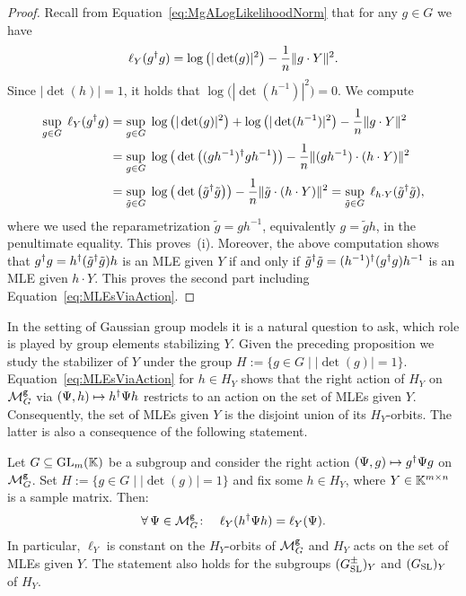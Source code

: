 \begin{proof}
	Recall from Equation~\eqref{eq:MgALogLikelihoodNorm} that for any $g \in G$ we have
	\begin{align*}
		\ell_Y(g^{\dagger} g) = \log \big( |\det(g)|^2 \big) - \frac{1}{n} \| g \cdot Y\|^2 .
	\end{align*}
	Since $\vert \det(h) \vert = 1$, it holds that $\log \big( |\det(h^{-1})|^2 \big) = 0$. We compute
		\begin{align*}
			\sup_{g \in G} \; \ell_Y(g^{\dagger} g) &= \sup_{g \in G} \; \log \big( |\det(g)|^2 \big) + \log \big( |\det(h^{-1})|^2 \big) - \frac{1}{n} \| g \cdot Y\|^2 \\
			&= \sup_{g \in G} \; \log \big( \det \big( (gh^{-1})^{\dagger} gh^{-1} \big) \big) - \frac{1}{n} \| (g h^{-1}) \cdot (h \cdot Y)\|^2 \\
			&= \sup_{\tilde{g} \in G} \; \log \big( \det \big( \tilde{g}^{\dagger} \tilde{g} \big) \big) - \frac{1}{n} \| \tilde{g} \cdot (h \cdot Y)\|^2
			= \sup_{\tilde{g} \in G} \; \ell_{h \cdot Y}(\tilde{g}^{\dagger} \tilde{g}),
		\end{align*}
	where we used the reparametrization $\tilde{g} = gh^{-1}$, equivalently $g = \tilde{g}h$, in the penultimate equality. This proves~(i). Moreover, the above computation shows that $g^{\dagger} g = h^{\dagger} (\tilde{g}^{\dagger} \tilde{g}) h$ is an MLE given $Y$ if and only if $\tilde{g}^{\dagger} \tilde{g} = (h^{-1})^{\dagger}	(g^{\dagger} g) h^{-1}$ is an MLE given $h \cdot Y$. This proves the second part including Equation~\eqref{eq:MLEsViaAction}.
\end{proof}

In the setting of Gaussian group models it is a natural question to ask, which role is played by group elements stabilizing $Y$. Given the preceding proposition we study the stabilizer of $Y$ under the group $H := \{g \in G \mid |\det(g)| = 1\}$. Equation~\eqref{eq:MLEsViaAction} for $h \in H_Y$ shows that the right action of $H_Y$ on $\mathcal{M}^{\mathtt{g}}_G$ via $(\Psi, h) \mapsto h^{\dagger} \Psi h$ restricts to an action on the set of MLEs given $Y$. Consequently, the set of MLEs given $Y$ is the disjoint union of its $H_Y$-orbits. The latter is also a consequence of the following statement.

\begin{prop}\label{prop:MLEsStabilizer}
	Let $G \subseteq \operatorname{GL}_m(\mathbb K)$ be a subgroup and consider the right action $(\Psi, g) \mapsto g^{\dagger} \Psi g$ on $\mathcal{M}^{\mathtt{g}}_G$. Set $H := \{g \in G \mid |\det(g)| = 1\}$ and fix some $h \in H_Y$, where $Y \in \mathbb K^{m \times n}$ is a sample matrix. Then:
		\begin{equation}\label{eq:ell-Y-constantOnOrbits}
			\forall \, \Psi \in \mathcal{M}^{\mathtt{g}}_{G} \colon \quad \ell_Y(h^{\dagger} \Psi h) = \ell_Y(\Psi) .
		\end{equation}
	In particular, $\ell_Y$ is constant on the $H_Y$-orbits of $\mathcal{M}^{\mathtt{g}}_G$ and $H_Y$ acts on the set of MLEs given $Y$.
	The statement also holds for the subgroups $(G_{\operatorname{SL}}^{\pm})_Y$ and $(G_{\operatorname{SL}})_Y$ of $H_Y$.
\end{prop}

